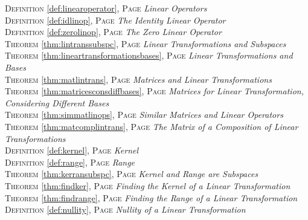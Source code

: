 \begin{multicols}{2}
{         \textsc{Definition} \ref{def:linearoperator}, \textsc{Page} \pageref{def:linearoperator} \textit{Linear Operators} \\
         \textsc{Definition} \ref{def:idlinop}, \textsc{Page} \pageref{def:idlinop} \textit{The Identity Linear Operator} \\
         \textsc{Definition} \ref{def:zerolinop}, \textsc{Page} \pageref{def:zerolinop} \textit{The Zero Linear Operator} \\
         \textsc{Theorem} \ref{thm:lintranssubspc}, \textsc{Page} \pageref{thm:lintranssubspc} \textit{Linear Transformations and Subspaces} \\
         \textsc{Theorem} \ref{thm:lineartransformationsbases}, \textsc{Page} \pageref{thm:lineartransformationsbases} \textit{Linear Transformations and Bases} \\
         \textsc{Theorem} \ref{thm:matlintrans}, \textsc{Page} \pageref{thm:matlintrans} \textit{Matrices and Linear Transformations} \\
         \textsc{Theorem} \ref{thm:matricesconsdiffbases}, \textsc{Page} \pageref{thm:matricesconsdiffbases} \textit{Matrices for Linear Transformation, Considering Different Bases} \\
         \textsc{Theorem} \ref{thm:simmatlinops}, \textsc{Page} \pageref{thm:simmatlinops} \textit{Similar Matrices and Linear Operators} \\
         \textsc{Theorem} \ref{thm:matcomplintrans}, \textsc{Page} \pageref{thm:matcomplintrans} \textit{The Matrix of a Composition of Linear Transformations} \\
         \textsc{Definition} \ref{def:kernel}, \textsc{Page} \pageref{def:kernel} \textit{Kernel} \\
         \textsc{Definition} \ref{def:range}, \textsc{Page} \pageref{def:range} \textit{Range} \\
         \textsc{Theorem} \ref{thm:kerransubspc}, \textsc{Page} \pageref{thm:kerransubspc} \textit{Kernel and Range are Subspaces} \\
         \textsc{Theorem} \ref{thm:findker}, \textsc{Page} \pageref{thm:findker} \textit{Finding the Kernel of a Linear Transformation} \\
         \textsc{Theorem} \ref{thm:findrange}, \textsc{Page} \pageref{thm:findrange} \textit{Finding the Range of a Linear Transformation} \\
         \textsc{Definition} \ref{def:nullity}, \textsc{Page} \pageref{def:nullity} \textit{Nullity of a Linear Transformation} \\
}
\end{multicols}
